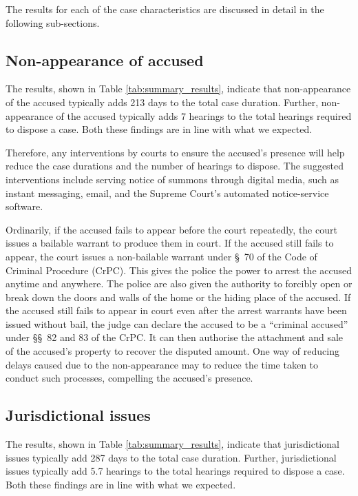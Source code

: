 The results for each of the case characteristics are discussed in detail in the following sub-sections.

\subsection{Non-appearance of accused}
\label{sec:non-appe-accus-1}

The results, shown in Table \ref{tab:summary_results}, indicate that non-appearance of the accused typically adds 213 days to the total case duration. Further, non-appearance of the accused typically adds 7 hearings to the total hearings required to dispose a case. Both these findings are in line with what we expected.

Therefore, any interventions by courts to ensure the accused's presence will help reduce the case durations and the number of hearings to dispose. The suggested interventions include serving notice of summons through digital media, such as instant messaging, email, and the Supreme Court's automated notice-service software.

Ordinarily, if the accused fails to appear before the court repeatedly, the court issues a bailable warrant to produce them in court. If the accused still fails to appear, the court issues a non-bailable warrant under \S~70 of the Code of Criminal Procedure (CrPC). This gives the police the power to arrest the accused anytime and anywhere. The police are also given the authority to forcibly open or break down the doors and walls of the home or the hiding place of the accused. If the accused still fails to appear in court even after the arrest warrants have been issued without bail, the judge can declare the accused to be a ``criminal accused'' under \S\S~82 and 83 of the CrPC. It can then authorise the attachment and sale of the accused's property to recover the disputed amount. One way of reducing delays caused due to the non-appearance may to reduce the time taken to conduct such processes, compelling the accused's presence.

\subsection{Jurisdictional issues}
\label{sec:jurisd-issu}

The results, shown in Table \ref{tab:summary_results}, indicate that jurisdictional issues typically add 287 days to the total case duration. Further, jurisdictional issues typically add 5.7 hearings to the total hearings required to dispose a case. Both these findings are in line with what we expected.

